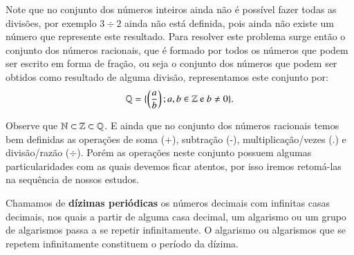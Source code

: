 Note que no conjunto dos números inteiros ainda não é possível fazer todas as divisões, por exemplo $3 \div 2$ ainda não está definida, pois ainda não existe um número que represente este resultado. Para resolver este problema surge então o conjunto dos números racionais, que é formado por todos os números que podem ser escrito em forma de fração, ou seja o conjunto dos números que podem ser obtidos como resultado de alguma divisão, representamos este conjunto por:
\[\mathbb{Q}= \{ \left(\frac{a}{b}\right); a, b \in \mathbb{Z} \text{ e } b \neq 0 \}.\]

Observe que $\mathbb{N} \subset \mathbb{Z} \subset \mathbb{Q}$. E ainda que no conjunto dos números racionais temos bem definidas as operações de soma (+), subtração (-), multiplicação/vezes (.) e divisão/razão ($\div$). Porém as operações neste conjunto possuem algumas particularidades com as quais devemos ficar atentos, por isso iremos retomá-las na sequência de nossos estudos.

 \vskip0.3cm
 \colorbox{azul}{
 \begin{minipage}{14.5cm}
 \begin{center}
  Chamamos de \textbf{dízimas periódicas} os números decimais com infinitas casas decimais, nos quais a partir de alguma casa decimal, um algarismo ou um grupo de algarismos passa a se repetir infinitamente. O algarismo ou algarismos que se repetem infinitamente constituem o período da dízima.
 \end{center}
 \end{minipage}}
 \vskip0.3cm

